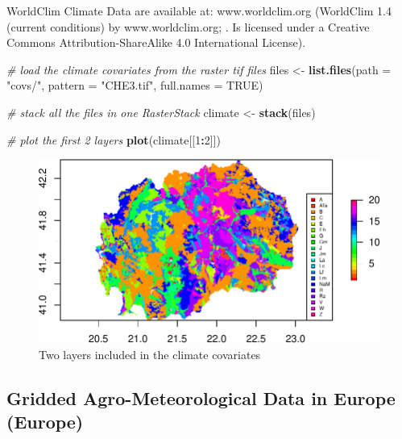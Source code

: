 \documentclass[10pt,b5paper,]{book}
\newenvironment{Shaded}{\begin{snugshade}}{\end{snugshade}}
\newcommand{\CommentTok}[1]{\textcolor[rgb]{0.56,0.35,0.01}{\textit{#1}}}
\newcommand{\DataTypeTok}[1]{\textcolor[rgb]{0.13,0.29,0.53}{#1}}
\newcommand{\DecValTok}[1]{\textcolor[rgb]{0.00,0.00,0.81}{#1}}
\newcommand{\KeywordTok}[1]{\textcolor[rgb]{0.13,0.29,0.53}{\textbf{#1}}}
\newcommand{\NormalTok}[1]{#1}
\newcommand{\OperatorTok}[1]{\textcolor[rgb]{0.81,0.36,0.00}{\textbf{#1}}}
\newcommand{\OtherTok}[1]{\textcolor[rgb]{0.56,0.35,0.01}{#1}}
\newcommand{\StringTok}[1]{\textcolor[rgb]{0.31,0.60,0.02}{#1}}
\theoremstyle{definition}
\theoremstyle{definition}
\theoremstyle{definition}
\theoremstyle{remark}
\begin{document}
WorldClim Climate Data are available at: www.worldclim.org (WorldClim
1.4 (current conditions) by www.worldclim.org; \citet{hijmans2005very}.
Is licensed under a Creative Commons Attribution-ShareAlike 4.0
International License).

\begin{Shaded}
\begin{Highlighting}[]
\CommentTok{# load the climate covariates from the raster tif files}
\NormalTok{files <-}\StringTok{ }\KeywordTok{list.files}\NormalTok{(}\DataTypeTok{path =} \StringTok{"covs/"}\NormalTok{, }\DataTypeTok{pattern =} \StringTok{"CHE3.tif"}\NormalTok{, }
                    \DataTypeTok{full.names =} \OtherTok{TRUE}\NormalTok{)}

\CommentTok{# stack all the files in one RasterStack}
\NormalTok{climate <-}\StringTok{ }\KeywordTok{stack}\NormalTok{(files)}
\end{Highlighting}
\end{Shaded}

\begin{Shaded}
\begin{Highlighting}[]
\CommentTok{# plot the first 2 layers}
\KeywordTok{plot}\NormalTok{(climate[[}\DecValTok{1}\OperatorTok{:}\DecValTok{2}\NormalTok{]])}
\end{Highlighting}
\end{Shaded}

\begin{figure}
\centering
\includegraphics{SOCMapping_files/figure-latex/unnamed-chunk-20-1.pdf}
\caption{\label{fig:unnamed-chunk-20}Two layers included in the climate
covariates}
\end{figure}

\hypertarget{gridded-agro-meteorological-data-in-europe-europe}{%
\subsection{Gridded Agro-Meteorological Data in Europe
(Europe)}\label{gridded-agro-meteorological-data-in-europe-europe}}
\end{document}

